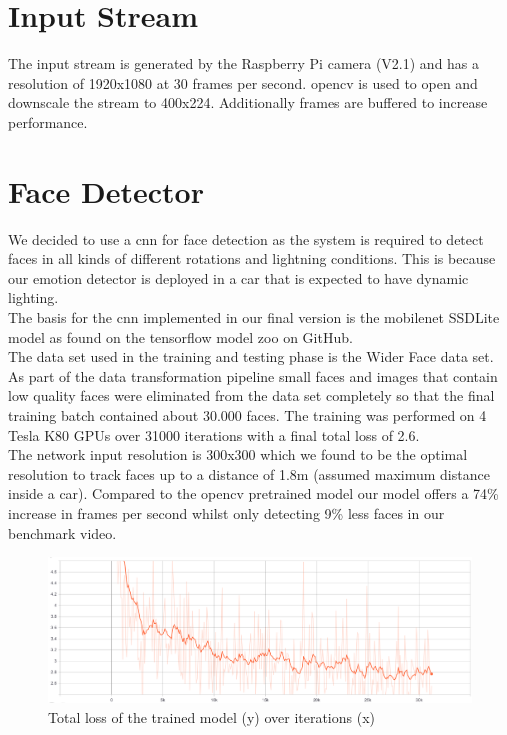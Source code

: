 \section{Input Stream}
The input stream is generated by the Raspberry Pi camera (V2.1) and has a resolution of 1920x1080 at 30 frames per second. \gls{opencv} is used to open and downscale the stream to 400x224. Additionally frames are buffered to increase performance.
\section{Face Detector}
We decided to use a \gls{cnn} for face detection as the system is required to detect faces in all kinds of different rotations and lightning conditions. This is because our emotion detector is deployed in a car that is expected to have dynamic lighting.\\
The basis for the \gls{cnn} implemented in our final version is the \gls{mobilenet} SSDLite model as found on the \gls{tensorflow} model zoo on GitHub. \cite{modelzoo} \\
The data set used in the training and testing phase is the Wider Face data set. \cite{widerface}\\
As part of the data transformation pipeline small faces and images that contain low quality faces were eliminated from the data set completely so that the final training batch contained about 30.000 faces. The training was performed on 4 Tesla K80 GPUs over 31000 iterations with a final total loss of 2.6.\\
The network input resolution is 300x300 which we found to be the optimal resolution to track faces up to a distance of 1.8m (assumed maximum distance inside a car).
Compared to the \gls{opencv} pretrained model our model offers a 74\% increase in frames per second whilst only detecting 9\% less faces in our benchmark video.
\begin{figure}[H]
  \centering
  \includegraphics[width=\columnwidth]{media/diagram_Tensorboard.png}
  \caption{Total loss of the trained model (y) over iterations (x)}
\end{figure}
